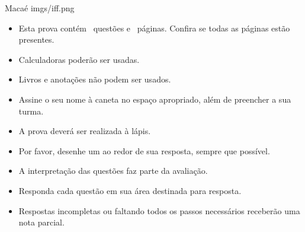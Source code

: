 \documentclass{yagoexam}
\begin{document}
 
	
	
	
	{Macaé} %
	{imgs/iff.png} %
	
	
	\maketitle
	
	
	\begin{itemize}
		
		\item Esta prova contém \numquestions\ questões e \numpages\ páginas. Confira se todas as páginas estão presentes.
		
		\item Calculadoras poderão ser usadas. 
		
		\item Livros e anotações não podem ser usados.
		
		\item Assine o seu nome à caneta no espaço apropriado, além de preencher a sua turma.
		
		\item A prova deverá ser realizada à lápis. 
		
		\item Por favor, desenhe um  ao redor de sua resposta, sempre que possível. 
		
		\item A interpretação das questões faz parte da avaliação.
		
		\item Responda cada questão em sua área destinada para resposta. 
		
		\item Respostas incompletas ou faltando todos os passos necessários receberão uma nota parcial.
		
	\end{itemize}
	
	\newpage %
	
	
	
\end{document}
